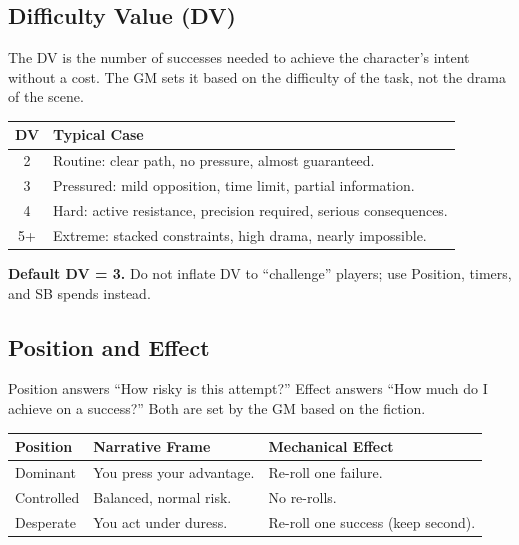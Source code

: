 \subsection{Difficulty Value (DV)}\label{subsec:difficulty_value}

The DV is the number of successes needed to achieve the character's intent
without a cost. The GM sets it based on the difficulty of the task, not the
drama of the scene.

\begin{tcolorbox}[title=Default DV Ladder, colback=white!97!gray, colframe=black!80!gray, sharp corners,breakable]
\begin{center}
\begin{tabular}{c p{3.5in}}
\toprule
\textbf{DV} & \textbf{Typical Case} \\
\midrule
2 & Routine: clear path, no pressure, almost guaranteed. \\
3 & Pressured: mild opposition, time limit, partial information. \\
4 & Hard: active resistance, precision required, serious consequences. \\
5+ & Extreme: stacked constraints, high drama, nearly impossible. \\
\bottomrule
\end{tabular}
\end{center}
\end{tcolorbox}

\noindent \textbf{Default DV = 3.} Do not inflate DV to ``challenge'' players; use
Position, timers, and SB spends instead.

\subsection{Position and Effect}\label{subsec:position_effect}

Position answers ``How risky is this attempt?'' Effect answers ``How much do I
achieve on a success?'' Both are set by the GM based on the fiction.

\begin{center}
\begin{tabular}{lll}
\toprule
\textbf{Position} & \textbf{Narrative Frame} & \textbf{Mechanical Effect} \\
\midrule
Dominant   & You press your advantage. & Re-roll one failure. \\
Controlled & Balanced, normal risk.   & No re-rolls. \\
Desperate  & You act under duress.    & Re-roll one success (keep second). \\
\bottomrule
\end{tabular}
\end{center}

